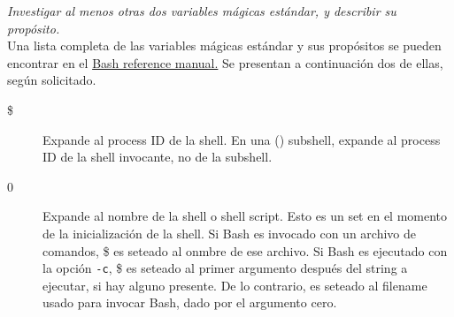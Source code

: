 \documentclass{article}
\begin{document}


\textit{Investigar al menos otras dos variables mágicas estándar, y describir su propósito.}\\

Una lista completa de las variables mágicas estándar y sus propósitos se pueden encontrar en el \href{https://www.gnu.org/software/bash/manual/html\_node/Variable-Index.html}{Bash reference manual.} Se presentan a continuación dos de ellas, según solicitado.\\

\begin{description}
    \item[\$] Expande al process ID de la shell. En una () subshell, expande al process ID de la shell invocante, no de la subshell.
    \item[0] Expande al nombre de la shell o shell script. Esto es un set en el momento de la inicialización de la shell. Si Bash es invocado con un archivo de comandos, \$ es seteado al onmbre de ese archivo. Si Bash es ejecutado con la opción \texttt{-c}, \$ es seteado al primer argumento después del string a ejecutar, si hay alguno presente. De lo contrario, es seteado al filename usado para invocar Bash, dado por el argumento cero.
\end{description}
\end{document}
